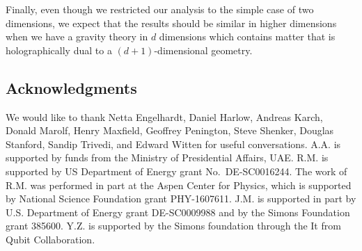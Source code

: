 \documentclass[11pt]{article}
\begin{document}
Finally, even though we restricted our analysis to the simple case of two dimensions, we expect that the results should be similar in higher dimensions when we have a gravity theory in $d$ dimensions which contains matter that is holographically dual to a $(d+1)$-dimensional geometry. 


\subsection*{Acknowledgments}

We would like to thank Netta Engelhardt, Daniel Harlow, Andreas Karch, Donald Marolf, Henry Maxfield, Geoffrey Penington, Steve Shenker, Douglas Stanford, Sandip Trivedi, and Edward Witten for useful conversations. 
A.A. is supported by funds from the Ministry of Presidential Affairs, UAE.
R.M. is supported by US Department of Energy grant No.\ DE-SC0016244.
The work of R.M. was performed in part at the Aspen Center for Physics, which is supported by National Science Foundation grant PHY-1607611.
J.M. is supported in part by U.S. Department of Energy grant DE-SC0009988 and by the Simons Foundation grant 385600.
Y.Z. is supported by the Simons foundation through the It from Qubit Collaboration.




\end{document}
